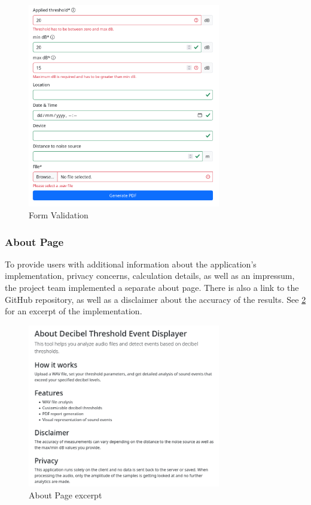 \begin{figure}[H]
    \centering
    \includegraphics[width=0.75\textwidth]{../assets/implementation_validation.png}
    \caption{Form Validation}\label{fig:implementation-validation}
\end{figure}

\subsubsection{About Page}\label{subsubsec:about-page}
To provide users with additional information about the application's implementation, privacy concerns, calculation details, as well as an impressum, the project team implemented
a separate about page. There is also a link to the GitHub repository, as well as a disclaimer about the accuracy of the results. See \ref{fig:implementation-about-page} for an excerpt of the implementation.
\begin{figure}[H]
    \centering
    \includegraphics[width=0.75\textwidth]{../assets/implementation_about_page.png}
    \caption{About Page excerpt}\label{fig:implementation-about-page}
\end{figure}

